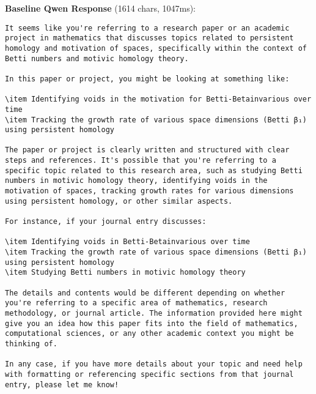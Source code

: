\documentclass[11pt,a4paper]{article}
\begin{document}
\textbf{Baseline Qwen Response} (1614 chars, 1047ms):
\begin{verbatim}It seems like you're referring to a research paper or an academic project in mathematics that discusses topics related to persistent homology and motivation of spaces, specifically within the context of Betti numbers and motivic homology theory.

In this paper or project, you might be looking at something like:

\item Identifying voids in the motivation for Betti-Betainvarious over time
\item Tracking the growth rate of various space dimensions (Betti β₁) using persistent homology

The paper or project is clearly written and structured with clear steps and references. It's possible that you're referring to a specific topic related to this research area, such as studying Betti numbers in motivic homology theory, identifying voids in the motivation of spaces, tracking growth rates for various dimensions using persistent homology, or other similar aspects.

For instance, if your journal entry discusses:

\item Identifying voids in Betti-Betainvarious over time 
\item Tracking the growth rate of various space dimensions (Betti β₁) using persistent homology
\item Studying Betti numbers in motivic homology theory

The details and contents would be different depending on whether you're referring to a specific area of mathematics, research methodology, or journal article. The information provided here might give you an idea how this paper fits into the field of mathematics, computational sciences, or any other academic context you might be thinking of.

In any case, if you have more details about your topic and need help with formatting or referencing specific sections from that journal entry, please let me know!
\end{verbatim}
\end{document}
